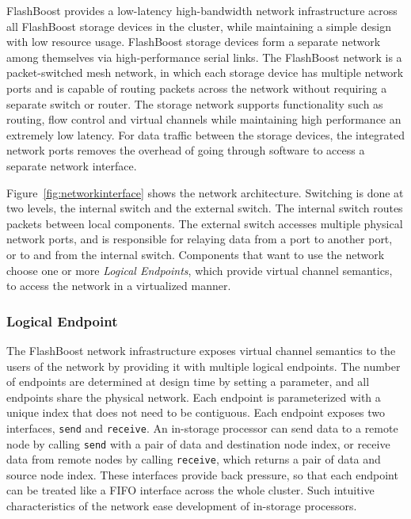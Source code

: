 FlashBoost provides a low-latency high-bandwidth network infrastructure across
all FlashBoost storage devices in the cluster, while maintaining a simple design
with low resource usage. FlashBoost storage devices form
a separate network among themselves via high-performance serial links.  The
FlashBoost network is a packet-switched mesh network, in which each storage device has multiple
network ports and is capable of routing packets across the network without
requiring a separate switch or router.  The storage network supports
functionality such as routing, flow control and virtual channels while
maintaining high performance an extremely low latency.  For data traffic between
the storage devices, the integrated network ports removes the overhead of going
through software to access a separate network interface.

Figure~\ref{fig:networkinterface} shows the network architecture. Switching is
done at two levels, the internal switch and the external switch.  The internal
switch routes packets between local components.  The external switch accesses
multiple physical network ports, and is responsible for relaying data from a
port to another port, or to and from the internal switch.
Components that want to use the network choose one or more \emph{Logical
Endpoints}, which provide virtual channel semantics, to access the network in a
virtualized manner.


\subsubsection{Logical Endpoint}

The FlashBoost network infrastructure exposes virtual channel semantics to the
users of the network by providing it with multiple logical endpoints.  The
number of endpoints are determined at design time by setting a parameter, and
all endpoints share the physical network.  Each endpoint is parameterized with a
unique index that does not need to be contiguous.  Each endpoint exposes two
interfaces, \texttt{send} and \texttt{receive}. An in-storage processor can send
data to a remote node by calling \texttt{send} with a pair of data and
destination node index, or receive data from remote nodes by calling
\texttt{receive}, which returns a pair of data and source node index. These
interfaces provide back pressure, so that each endpoint can be treated like a
FIFO interface across the whole cluster. Such intuitive characteristics of the
network ease development of in-storage processors.

